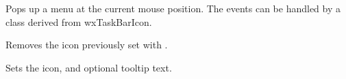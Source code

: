 \label{wxtaskbariconpopupmenu}


Pops up a menu at the current mouse position. The events can be handled by
a class derived from wxTaskBarIcon.

\label{wxtaskbariconremoveicon}


Removes the icon previously set with .

\label{wxtaskbariconseticon}


Sets the icon, and optional tooltip text.


